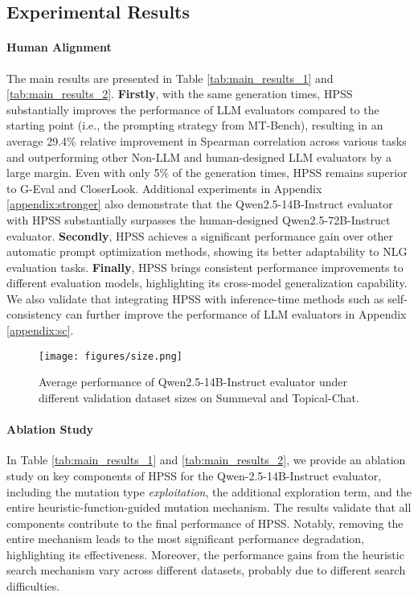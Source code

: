 \subsection{Experimental Results}

\paragraph{Human Alignment}
The main results are presented in Table \ref{tab:main_results_1} and \ref{tab:main_results_2}. 
\textbf{Firstly}, with the same generation times, 
HPSS substantially improves the performance of LLM evaluators compared to the starting point (i.e., the prompting strategy from MT-Bench), resulting in an average 29.4\% relative improvement in Spearman correlation across various tasks and outperforming other Non-LLM and human-designed LLM evaluators by a large margin. 
Even with only 5\% of the generation times, HPSS remains superior to G-Eval and CloserLook.
Additional experiments in Appendix \ref{appendix:stronger} also demonstrate that the Qwen2.5-14B-Instruct evaluator with HPSS substantially surpasses the human-designed Qwen2.5-72B-Instruct evaluator.
\textbf{Secondly}, HPSS achieves a significant performance gain over other automatic prompt optimization methods, showing its better adaptability to NLG evaluation tasks.
\textbf{Finally}, HPSS brings consistent performance improvements to different evaluation models, highlighting its cross-model generalization capability. 
We also validate that integrating HPSS with inference-time methods such as self-consistency \cite{wang2022self} can further improve the performance of LLM evaluators in Appendix \ref{appendix:sc}. 

\begin{figure}[t]
\scriptsize
    \centering
    \texttt{[image: figures/size.png]}
    \vspace{-4mm}
    \caption{Average performance of Qwen2.5-14B-Instruct evaluator under different validation dataset sizes on Summeval and Topical-Chat.} 
    \vspace{-4mm}
    \label{fig:size}
\end{figure}

\paragraph{Ablation Study} In Table \ref{tab:main_results_1} and \ref{tab:main_results_2}, we provide an ablation study on key components of HPSS for the Qwen-2.5-14B-Instruct evaluator, 
including the mutation type \textit{exploitation}, 
the additional exploration term, 
and the entire heuristic-function-guided mutation mechanism. 
The results validate that all components contribute to the final performance of HPSS. 
Notably, removing the entire mechanism leads to the most significant performance degradation, highlighting its effectiveness.
Moreover, the performance gains from the heuristic search mechanism vary across different datasets, probably due to different search difficulties.


